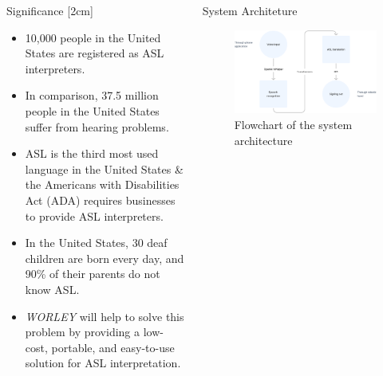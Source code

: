 \documentclass[final, 20pt]{beamer}
\newlength{\colwidth}
\begin{document}
\begin{frame}[t]
\begin{columns}[t]
\begin{column}{\colwidth}
\begin{block}{Significance}
        [2cm]

        \begin{itemize}
          \item 10,000 people in the United States are registered as ASL interpreters.
          \item In comparison, 37.5 million people in the United States suffer from hearing problems.
          \item ASL is the third most used language in the United States \& the Americans with Disabilities Act (ADA) requires businesses to provide ASL interpreters.
          \item In the United States, 30 deaf children are born every day, and 90\% of their parents do not know ASL.
          \item \emph{WORLEY} will help to solve this problem by providing a low-cost, portable, and easy-to-use solution for ASL interpretation.
        \end{itemize}
      \end{block}
    \end{column}

    \separatorcolumn

    \begin{column}{\colwidth}
      \begin{block}{System Architeture}
        \begin{figure}[ht]
          \centering
          \includegraphics[width=0.85\linewidth]{images/flowchart.png}
          \caption{Flowchart of the system architecture}
          \label{fig:flowchart}
        \end{figure}


\end{block}
\end{column}
\end{columns}
\end{frame}
\end{document}
